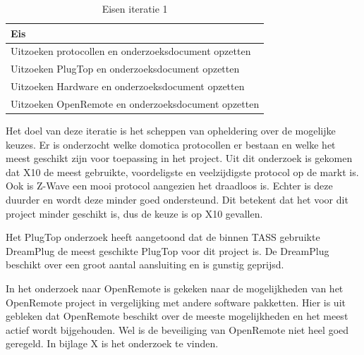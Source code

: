 \documentclass[]{article}
\begin{document}
\begin{table}[htpb]
  \caption{Eisen iteratie 1}
  \begin{center}
    \begin{tabular}{|| l ||}\hline
        Eis                                                  \\\hline\hline
        Uitzoeken protocollen en onderzoeksdocument opzetten \\\hline
        Uitzoeken PlugTop en onderzoeksdocument opzetten     \\\hline
        Uitzoeken Hardware en onderzoeksdocument opzetten    \\\hline
        Uitzoeken OpenRemote en onderzoeksdocument opzetten  \\\hline
    \end{tabular}
  \end{center}
\end{table}

Het doel van deze iteratie is het scheppen van opheldering over de mogelijke
keuzes. Er is onderzocht welke domotica protocollen er bestaan en welke het
meest geschikt zijn voor toepassing in het project. Uit dit onderzoek is gekomen
dat X10 de meest gebruikte, voordeligste en veelzijdigste protocol op de markt
is. Ook is Z-Wave een mooi protocol aangezien het draadloos is. Echter is deze
duurder en wordt deze minder goed ondersteund. Dit betekent dat het voor dit
project minder geschikt is, dus de keuze is op X10 gevallen.  

Het PlugTop onderzoek heeft aangetoond dat de binnen TASS gebruikte
DreamPlug de meest geschikte PlugTop voor dit project is. De DreamPlug
beschikt over een groot aantal aansluiting en is gunstig geprijsd. 

In het onderzoek naar OpenRemote is gekeken naar de mogelijkheden van het
OpenRemote project in vergelijking met andere software pakketten. Hier is uit
gebleken dat OpenRemote beschikt over de meeste mogelijkheden en het meest
actief wordt bijgehouden. Wel is de beveiliging van OpenRemote niet heel
goed geregeld. In bijlage X is het onderzoek te vinden.
\end{document}
